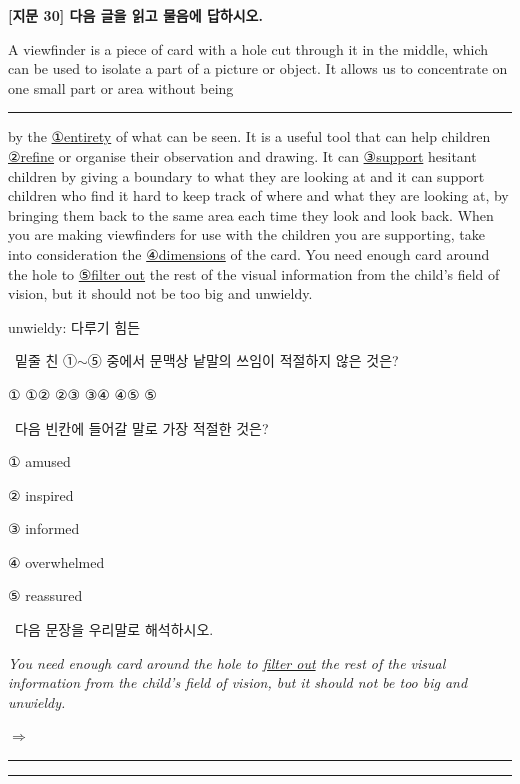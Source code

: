 \documentclass[11pt,a4paper]{article}
\newcommand{\qno}[1]{\par\vspace{8pt}\noindent{\sffamily\bfseries #1.}\ }
\newcommand{\instr}[1]{{\sffamily #1}\par\vspace{3pt}}
\begin{document}
\begin{center}
{\fontsize{15}{17}\selectfont\sffamily\bfseries [지문 30] 다음 글을 읽고 물음에 답하시오.}
\end{center}
\vspace{4pt}

\begin{pbox}
A viewfinder is a piece of card with a hole cut through it in the middle, which can be used to isolate a part of a picture or object. It allows us to concentrate on one small part or area without being \rule{3cm}{0.4pt} by the \underline{①entirety} of what can be seen. It is a useful tool that can help children \underline{②refine} or organise their observation and drawing. It can \underline{③support} hesitant children by giving a boundary to what they are looking at and it can support children who find it hard to keep track of where and what they are looking at, by bringing them back to the same area each time they look and look back. When you are making viewfinders for use with the children you are supporting, take into consideration the \underline{④dimensions} of the card. You need enough card around the hole to \underline{⑤filter out} the rest of the visual information from the child's field of vision, but it should not be too big and unwieldy.

\vspace{4pt}
\noindent * unwieldy: 다루기 힘든
\end{pbox}

\qno{1}\instr{밑줄 친 ①$\sim$⑤ 중에서 문맥상 낱말의 쓰임이 적절하지 않은 것은?}
\begin{choices}
\item ① ①\quad ② ②\quad ③ ③\quad ④ ④\quad ⑤ ⑤
\end{choices}

\qno{2}\instr{다음 빈칸에 들어갈 말로 가장 적절한 것은?}
\begin{choices}
\item ① amused
\item ② inspired
\item ③ informed
\item ④ overwhelmed
\item ⑤ reassured
\end{choices}

\qno{3}\instr{[서술형] 다음 문장을 우리말로 해석하시오.}
\vspace{2pt}\par\noindent
\hspace{1em}\textit{You need enough card around the hole to \underline{filter out} the rest of the visual information from the child's field of vision, but it should not be too big and unwieldy.}
\par\vspace{6pt}\noindent
$\Rightarrow$ \rule{\linewidth}{0.4pt}
\par\vspace{4pt}\noindent
\rule{\linewidth}{0.4pt}
\end{document}
